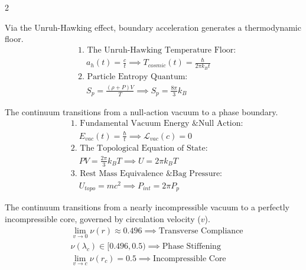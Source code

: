 \begin{multicols}{2}
\begin{tcolorbox}[cheatbox, title={\refstepcounter{cheatnum}\label{box:thermo_vacuum}\thecheatnum. Thermodynamic Vacuum \& Entropy \hfill\makebox[0pt][r]{\scriptsize\hyperref[sec:deriv_thermo_vacuum]{[Proof $\downarrow$]}}}]
Via the Unruh-Hawking effect, boundary acceleration generates a thermodynamic floor. 
\begin{align}
    &\text{1. The Unruh-Hawking Temperature Floor:} \nonumber \\
    &\quad a_{h}(t) = \frac{c}{t} \implies T_{cosmic}(t) = \frac{\hbar}{2\pi k_B t} \label{eq:tcosmic} \\
    &\text{2. Particle Entropy Quantum:} \nonumber \\
    &\quad S_p = \frac{(\rho + P)V}{T} \implies S_p = \frac{8\pi}{3} k_B \label{eq:sp}
\end{align}
\end{tcolorbox}

\begin{tcolorbox}[cheatbox, title={\refstepcounter{cheatnum}\label{box:unified_eos}\thecheatnum. The Unified Equation of State \hfill\makebox[0pt][r]{\scriptsize\hyperref[sec:deriv_unified_eos]{[Proof $\downarrow$]}}}]
The continuum transitions from a null-action vacuum to a phase boundary.
\begin{align}
    &\text{1. Fundamental Vacuum Energy \& Null Action:} \nonumber \\
    &\quad E_{vac}(t) = \frac{\hbar}{t} \implies \mathcal{L}_{vac}(c) = 0 \label{eq:vacuum_null_action} \\
    &\text{2. The Topological Equation of State:} \nonumber \\
    &\quad PV = \frac{2\pi}{3} k_B T \implies U = 2\pi k_B T \label{eq:unified_topological_eos} \\
    &\text{3. Rest Mass Equivalence \& Bag Pressure:} \nonumber \\
    &\quad U_{topo} = mc^2 \implies P_{int} = 2\pi P_p \label{eq:unified_pressure_ratio}
\end{align}
\end{tcolorbox}

\begin{tcolorbox}[cheatbox, title={\refstepcounter{cheatnum}\label{box:rheological_gradient}\thecheatnum. The Continuous Rheological Gradient \hfill\makebox[0pt][r]{\scriptsize\hyperref[sec:deriv_rheological_gradient]{[Proof $\downarrow$]}}}]
The continuum transitions from a nearly incompressible vacuum to a perfectly incompressible core, governed by circulation velocity ($v$). 
\begin{align}
    &\lim_{v \to 0} \nu(r) \approx 0.496 \implies \text{Transverse Compliance} \label{eq:poisson_macro} \\
    &\nu(\lambda_c) \in [0.496, 0.5) \implies \text{Phase Stiffening} \label{eq:poisson_compton} \\
    &\lim_{v \to c} \nu(r_c) = 0.5 \implies \text{Incompressible Core} \label{eq:poisson_local} 
\end{align}
\end{tcolorbox}


\end{multicols}
